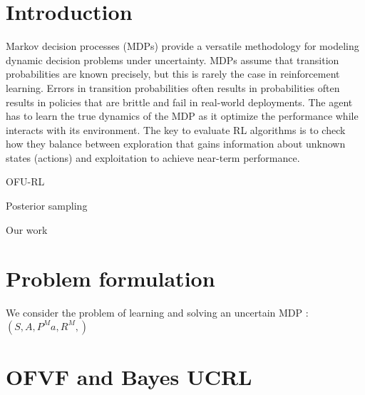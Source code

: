 \documentclass{article}
\begin{document}
\section{Introduction}






Markov decision processes (MDPs) provide a versatile methodology for
modeling dynamic decision problems under uncertainty. MDPs assume that
transition probabilities are known precisely, but this is rarely the
case in reinforcement learning. Errors in transition probabilities
often results in probabilities often results in policies that are
brittle and fail in real-world deployments. The agent has to learn the
true dynamics of the MDP as it optimize the performance while
interacts with its environment. The key to evaluate RL algorithms is
to check how they balance between exploration that gains information
about unknown states (actions) and exploitation to  achieve near-term
performance. 


OFU-RL

Posterior sampling

Our work


\section{Problem formulation}
We consider the problem of learning and solving an uncertain
 MDP :$(S,A,P^Ma, R^M,)$ 

\section{OFVF and Bayes UCRL}
\end{document}

